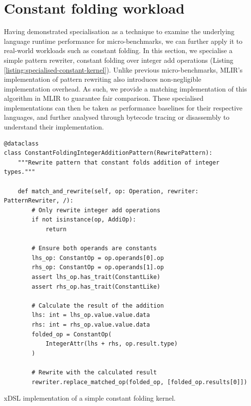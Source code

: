 \section{Constant folding workload}

Having demonstrated specialisation as a technique to examine the underlying language runtime performance for micro-benchmarks, we can further apply it to real-world workloads such as constant folding.
In this section, we specialise a simple pattern rewriter, constant folding over integer add operations (Listing \ref{listing:specialised-constant-kernel}). Unlike previous micro-benchmarks, MLIR's implementation of pattern rewriting also introduces non-negligible implementation overhead. As such, we provide a matching implementation of this algorithm in MLIR to guarantee fair comparison.
These specialised implementations can then be taken as performance baselines for their respective languages, and further analysed through bytecode tracing or disassembly to understand their implementation.

\vspace{2em}

\begin{code}
    \begin{verbatim}
@dataclass
class ConstantFoldingIntegerAdditionPattern(RewritePattern):
    """Rewrite pattern that constant folds addition of integer types."""

    def match_and_rewrite(self, op: Operation, rewriter: PatternRewriter, /):
        # Only rewrite integer add operations
        if not isinstance(op, AddiOp):
            return

        # Ensure both operands are constants
        lhs_op: ConstantOp = op.operands[0].op
        rhs_op: ConstantOp = op.operands[1].op
        assert lhs_op.has_trait(ConstantLike)
        assert rhs_op.has_trait(ConstantLike)

        # Calculate the result of the addition
        lhs: int = lhs_op.value.value.data
        rhs: int = rhs_op.value.value.data
        folded_op = ConstantOp(
            IntegerAttr(lhs + rhs, op.result.type)
        )

        # Rewrite with the calculated result
        rewriter.replace_matched_op(folded_op, [folded_op.results[0]])
    \end{verbatim}
    \caption{xDSL implementation of a simple constant folding kernel.}
    \label{listing:specialised-constant-kernel}
\end{code}


